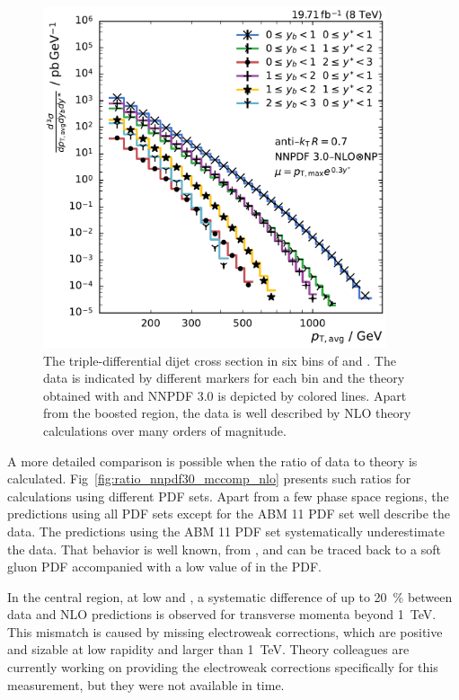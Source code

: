 \begin{figure}[h!tbp]
    \centering
    \includegraphics[width=0.9\textwidth]{figures/measurement/ptavg_spectrum.pdf}\hfill
    \caption[Spectrum of the triple-differential dijet cross section]{The
    triple-differential dijet cross section in six bins of \ystar and \yboost. The
    data is indicated by different markers for each bin and the theory obtained
    with \NLOJETPP and NNPDF 3.0 is depicted by colored lines. Apart from the
    boosted region, the data is well described by NLO theory calculations over many orders of magnitude.}
    \label{fig:measurement_result}
\end{figure}

A more detailed comparison is possible when the ratio of data to theory is
calculated. Fig~\ref{fig:ratio_nnpdf30_mccomp_nlo} presents
such ratios for calculations using different PDF sets. Apart
from a few phase space regions, the predictions using all PDF sets except for
the ABM 11 PDF set well describe the data. The predictions using the ABM 11 PDF
set systematically underestimate the data. That behavior is well known, \eg
from \cite{Khachatryan:2014waa,Stober:2012abc}, and can be traced back to a
soft gluon PDF accompanied with a low value of \asmz in the PDF.

In the central region, at low \yboost and \ystar, a systematic difference of up
to \SI{20}{\percent} between data and NLO predictions is observed for transverse
momenta beyond \SI{1}{\TeV}. This mismatch is caused by missing electroweak
corrections, which are positive and sizable at low rapidity and \pt larger
than \SI{1}{\TeV}. Theory colleagues are currently working on providing the
electroweak corrections specifically for this measurement, but they
were not available in time.

